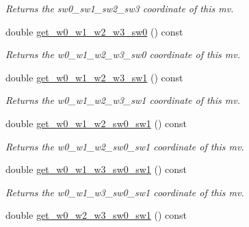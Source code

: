 \begin{DoxyCompactItemize}
\begin{DoxyCompactList}\small\item\em Returns the sw0\-\_\-sw1\-\_\-sw2\-\_\-sw3 coordinate of this mv. \end{DoxyCompactList}\item 
\hypertarget{classe3ga_1_1mv_a594eb2d49d795d4eab07cc2f6cd65361}{double \hyperlink{classe3ga_1_1mv_a594eb2d49d795d4eab07cc2f6cd65361}{get\-\_\-w0\-\_\-w1\-\_\-w2\-\_\-w3\-\_\-sw0} () const }\label{classe3ga_1_1mv_a594eb2d49d795d4eab07cc2f6cd65361}

\begin{DoxyCompactList}\small\item\em Returns the w0\-\_\-w1\-\_\-w2\-\_\-w3\-\_\-sw0 coordinate of this mv. \end{DoxyCompactList}\item 
\hypertarget{classe3ga_1_1mv_a2165c51ea4703e34f372cbda396070da}{double \hyperlink{classe3ga_1_1mv_a2165c51ea4703e34f372cbda396070da}{get\-\_\-w0\-\_\-w1\-\_\-w2\-\_\-w3\-\_\-sw1} () const }\label{classe3ga_1_1mv_a2165c51ea4703e34f372cbda396070da}

\begin{DoxyCompactList}\small\item\em Returns the w0\-\_\-w1\-\_\-w2\-\_\-w3\-\_\-sw1 coordinate of this mv. \end{DoxyCompactList}\item 
\hypertarget{classe3ga_1_1mv_a397cfaae8ce576afe7c00435860c46dd}{double \hyperlink{classe3ga_1_1mv_a397cfaae8ce576afe7c00435860c46dd}{get\-\_\-w0\-\_\-w1\-\_\-w2\-\_\-sw0\-\_\-sw1} () const }\label{classe3ga_1_1mv_a397cfaae8ce576afe7c00435860c46dd}

\begin{DoxyCompactList}\small\item\em Returns the w0\-\_\-w1\-\_\-w2\-\_\-sw0\-\_\-sw1 coordinate of this mv. \end{DoxyCompactList}\item 
\hypertarget{classe3ga_1_1mv_af84118870c22a74583e28ae749157fe1}{double \hyperlink{classe3ga_1_1mv_af84118870c22a74583e28ae749157fe1}{get\-\_\-w0\-\_\-w1\-\_\-w3\-\_\-sw0\-\_\-sw1} () const }\label{classe3ga_1_1mv_af84118870c22a74583e28ae749157fe1}

\begin{DoxyCompactList}\small\item\em Returns the w0\-\_\-w1\-\_\-w3\-\_\-sw0\-\_\-sw1 coordinate of this mv. \end{DoxyCompactList}\item 
\hypertarget{classe3ga_1_1mv_a54de421d9129363cd20e2f1f34dfa36a}{double \hyperlink{classe3ga_1_1mv_a54de421d9129363cd20e2f1f34dfa36a}{get\-\_\-w0\-\_\-w2\-\_\-w3\-\_\-sw0\-\_\-sw1} () const }\label{classe3ga_1_1mv_a54de421d9129363cd20e2f1f34dfa36a}


\end{DoxyCompactItemize}
